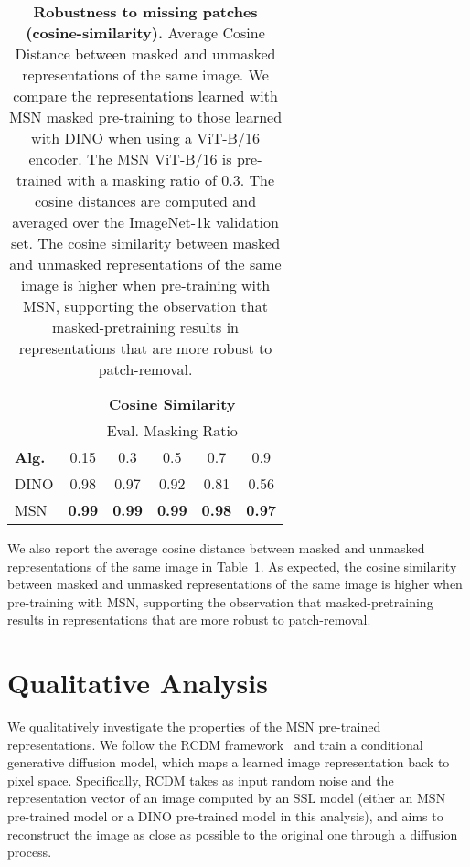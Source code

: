 \documentclass{article}
\begin{document}
\begin{table}[t]
  \footnotesize
  \centering
  \caption{{\bf Robustness to missing patches (cosine-similarity).} Average Cosine Distance between masked and unmasked representations of the same image. We compare the representations learned with MSN masked pre-training to those learned with DINO when using a ViT-B/16 encoder. The MSN ViT-B/16 is pre-trained with a masking ratio of 0.3. The cosine distances are computed and averaged over the ImageNet-1k validation set. The cosine similarity between masked and unmasked representations of the same image is higher when pre-training with MSN, supporting the observation that masked-pretraining results in representations that are more robust to patch-removal.\\}
  \label{tb:robust_mask_cosine}
        {\small
       \begin{tabular}{l c c c c c}
        & \multicolumn{5}{c}{\bf Cosine Similarity} \\[2mm]
        & \multicolumn{5}{c}{Eval. Masking Ratio} \\
        \bf\small Alg. & 0.15 & 0.3 & 0.5 & 0.7 & 0.9 \\ \toprule
        DINO & 0.98 & 0.97 & 0.92 & 0.81 & 0.56\\ 
        MSN & \cellcolor{fbApp}\bf 0.99 & \cellcolor{fbApp}\bf 0.99 & \cellcolor{fbApp}\bf 0.99 & \cellcolor{fbApp}\bf 0.98 & \cellcolor{fbApp}\bf 0.97\\ \bottomrule
    \end{tabular}}
\end{table}

We also report the average cosine distance between masked and unmasked representations of the same image in Table~\ref{tb:robust_mask_cosine}.
As expected, the cosine similarity between masked and unmasked representations of the same image is higher when pre-training with MSN, supporting the observation that masked-pretraining results in representations that are more robust to patch-removal.


\section{Qualitative Analysis}
\label{apndx:qualitative}
We qualitatively investigate the properties of the MSN pre-trained representations.
We follow the RCDM framework~\citep{bordes2021high} and train a conditional generative diffusion model, which maps a learned image representation back to pixel space. Specifically, RCDM takes as input random noise and the representation vector of an image computed by an SSL model (either an MSN pre-trained model or a DINO pre-trained model in this analysis), and aims to reconstruct the image as close as possible to the original one through a diffusion process. 
\end{document}
